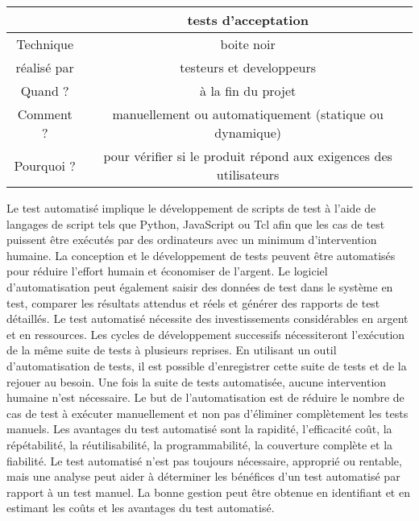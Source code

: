 \label{sec:criteres}
\begin{center}
    

\begin{tabular}{|c|c|}
    
    \hline
    \hline
    & tests d'acceptation  \\ \hline
    Technique & boite noir \\ \hline
    réalisé par & testeurs et developpeurs \\ \hline
    Quand ? & à la fin du projet \\ \hline
    Comment ? & manuellement ou automatiquement (statique ou dynamique) \\ \hline
    Pourquoi ? & pour vérifier si le produit répond aux exigences des utilisateurs \\ \hline
    \hline
\end{tabular}
\end{center}
Le test automatisé implique le développement de scripts de test à l'aide de langages de script tels que Python, JavaScript ou Tcl afin que les cas de test puissent être exécutés par des ordinateurs avec un minimum d'intervention humaine. La conception et le développement de tests peuvent être automatisés pour réduire l'effort humain et économiser de l'argent. Le logiciel d'automatisation peut également saisir des données de test dans le système en test, comparer les résultats attendus et réels et générer des rapports de test détaillés. Le test automatisé nécessite des investissements considérables en argent et en ressources. Les cycles de développement successifs nécessiteront l'exécution de la même suite de tests à plusieurs reprises. En utilisant un outil d'automatisation de tests, il est possible d'enregistrer cette suite de tests et de la rejouer au besoin. Une fois la suite de tests automatisée, aucune intervention humaine n'est nécessaire. Le but de l'automatisation est de réduire le nombre de cas de test à exécuter manuellement et non pas d'éliminer complètement les tests manuels. Les avantages du test automatisé sont la rapidité, l'efficacité coût, la répétabilité, la réutilisabilité, la programmabilité, la couverture complète et la fiabilité. Le test automatisé n'est pas toujours nécessaire, approprié ou rentable, mais une analyse peut aider à déterminer les bénéfices d'un test automatisé par rapport à un test manuel. La bonne gestion peut être obtenue en identifiant et en estimant les coûts et les avantages du test automatisé.